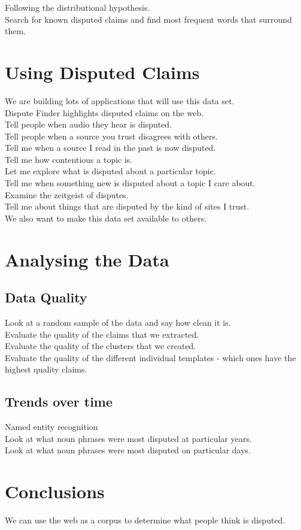 \documentclass{www2010-submission}
\newcommand{\todo}[1]{}
\newcommand{\x}[1]{{\color{blue} #1}\\}
\begin{document}
\x{Following the distributional hypothesis.}
\x{Search for known disputed claims and find most frequent words that surround them.}

\section{Using Disputed Claims}

\x{We are building lots of applications that will use this data set.}
\x{Dispute Finder highlights disputed claims on the web.}
\x{Tell people when audio they hear is disputed.}
\x{Tell people when a source you trust disagrees with others.}
\x{Tell me when a source I read in the past is now disputed.}
\x{Tell me how contentious a topic is.}
\x{Let me explore what is disputed about a particular topic.}
\x{Tell me when something new is disputed about a topic I care about.}
\x{Examine the zeitgeist of disputes.}
\x{Tell me about things that are disputed by the kind of sites I trust.}
\x{We also want to make this data set available to others.}

\section{Analysing the Data}

\subsection{Data Quality}

\x{Look at a random sample of the data and say how clean it is.}
\x{Evaluate the quality of the claims that we extracted.}
\x{Evaluate the quality of the clusters that we created.}
\x{Evaluate the quality of the different individual templates - which ones have the highest quality claims.}

\subsection{Trends over time}

\x{Named entity recognition}

\x{Look at what noun phrases were most disputed at particular years.}
\x{Look at what noun phrases were most disputed on particular days.}


\section{Conclusions}

\x{We can use the web as a corpus to determine what people think is disputed.}



\todo{Do we want to have acknowledgements}


\end{document}
